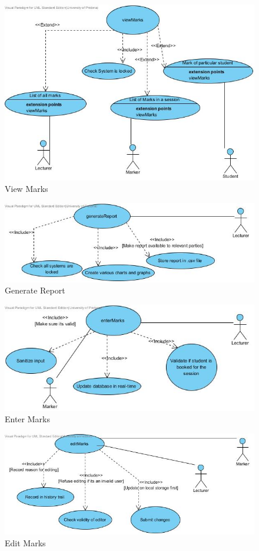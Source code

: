 \documentclass[a4paper]{article}
\begin{document}
			\begin{figure}[H]
				\centering
				\includegraphics[width=1\textwidth]{viewMarks}
				\caption{View Marks}
			\end{figure}
			\begin{figure}[H]
				\centering
				\includegraphics[width=1\textwidth]{generateReport}
				\caption{Generate Report}
			\end{figure}
			\begin{figure}[H]
				\centering
				\includegraphics[width=1\textwidth]{enterMarks}
				\caption{Enter Marks}
			\end{figure}
			\begin{figure}[H]
				\centering
				\includegraphics[width=1\textwidth]{editMarks}
				\caption{Edit Marks}
			\end{figure}
\end{document}
